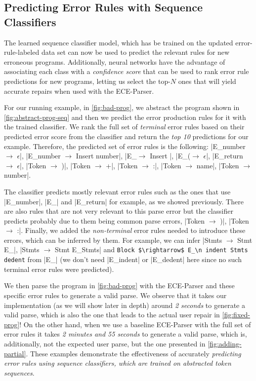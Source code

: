 \subsection{Predicting Error Rules with Sequence Classifiers}
\label{sec:overview:seq-classifiers}

The learned sequence classifier model,
which has be trained on the updated
error-rule-labeled data set can now
be used to predict the relevant rules
for new erroneous programs.
%
Additionally, neural networks have
the advantage of associating each
class with a \emph{confidence score}
that can be used to rank error rule
predictions for new programs, letting
us select the top-$N$ ones that will
yield accurate repairs when used
with the ECE-Parser.

For our running example, in \autoref{fig:bad-prog}, we abstract the program
shown in \autoref{fig:abstract-prog-seq} and then we predict the error
production rules for it with the trained classifier. We rank the full set of
\emph{terminal} error rules based on their predicted error score from the
classifier and return the \emph{top 10} predictions for our example. Therefore,
the predicted set of error rules is the following:
%
|E_number $\rightarrow$ $\epsilon$|, \linebreak
%
|E_number $\rightarrow$ Insert number|, |E_\n $\rightarrow$ Insert \n|,
%
|E_($\rightarrow$ $\epsilon$|,
%
|E_return $\rightarrow$ $\epsilon$|, |Token $\rightarrow$ )|,
%
|Token $\rightarrow$ +|, |Token $\rightarrow$ :|, |Token $\rightarrow$ name|,
%
|Token $\rightarrow$ number|.

The classifier predicts mostly relevant error rules such as the ones that use
|E_number|, \linebreak
%
|E_\n| and |E_return| for example, as we showed previously. There are also rules
that are not very relevant to this parse error but the classifier predicts
probably due to them being common parse errors, \eg
%
|Token $\rightarrow$ )|, |Token $\rightarrow$ :|. Finally, we added the
\emph{non-terminal} error rules needed to introduce these errors, which can be
inferred by them. For example, we can infer
%
|Stmts $\rightarrow$ Stmt E_\n|, |Stmts $\rightarrow$ Stmt E_\n Stmts| and
%
\lstinline{Block $\rightarrow$ E_\n indent Stmts dedent} from |E_\n| (we don't
need \linebreak |E_indent| or |E_dedent| here since no such terminal error rules were
predicted).

We then parse the program in \autoref{fig:bad-prog} with the ECE-Parser and
these specific error rules to generate a valid parse. We observe that it takes
our implementation (as we will show later in depth) around \emph{2 seconds} to
generate a valid parse, which is also the one that leads to the actual user
repair in \autoref{fig:fixed-prog}! On the other hand, when we use a baseline
ECE-Parser with the full set of error rules it takes \emph{2 minutes and 55
seconds} to generate a valid parse, which is, additionally, not the expected
user parse, but the one presented in \autoref{fig:adding-partial}. These
examples demonstrate the effectiveness of accurately \emph{predicting error
rules using sequence classifiers, which are trained on abstracted token
sequences}.

